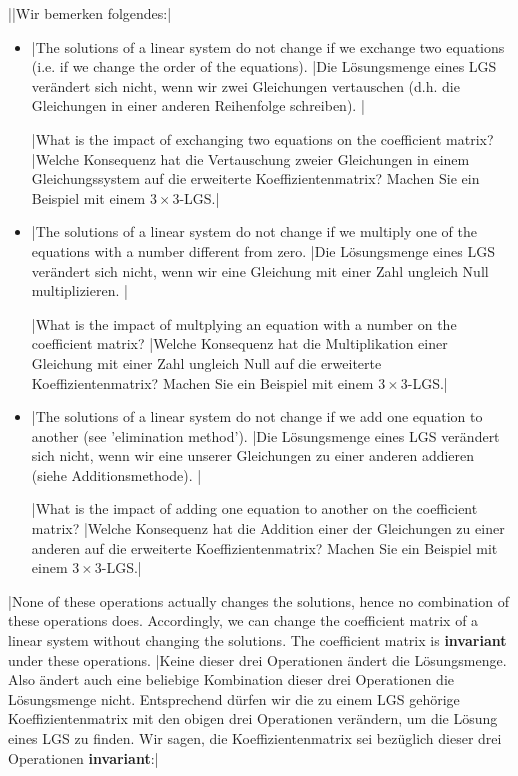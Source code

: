 \tr||Wir bemerken folgendes:|
\begin{itemize}
\item \tr|The solutions of a linear system do not change if we exchange two equations (i.e. if we change the order of the equations).
         |Die Lösungsmenge eines LGS verändert sich nicht, wenn wir zwei Gleichungen vertauschen (d.h. die Gleichungen in einer anderen Reihenfolge schreiben). |
\begin{exer}
\tr|What is the impact of exchanging two equations on the coefficient matrix?
   |Welche Konsequenz hat die Vertauschung zweier Gleichungen in einem Gleichungssystem auf die erweiterte Koeffizientenmatrix? Machen Sie ein Beispiel mit einem $3\times 3$-LGS.|
\end{exer}
\vfill

\item \tr|The solutions of a linear system do not change if we multiply one of the equations with a number different from zero.
         |Die Lösungsmenge eines LGS verändert sich nicht, wenn wir eine Gleichung mit einer Zahl ungleich Null multiplizieren. |
\begin{exer}
\tr|What is the impact of multplying an equation with a number on the coefficient matrix?
   |Welche Konsequenz hat die Multiplikation einer Gleichung mit einer Zahl ungleich Null auf die erweiterte Koeffizientenmatrix? Machen Sie ein Beispiel mit einem $3\times 3$-LGS.|
\end{exer}
\vfill

\item \tr|The solutions of a linear system do not change if we add one equation to another (see 'elimination method').
         |Die Lösungsmenge eines LGS verändert sich nicht, wenn wir eine unserer Gleichungen zu einer anderen addieren (siehe Additionsmethode). |
\begin{exer}
\tr|What is the impact of adding one equation to another on the coefficient matrix?
   |Welche Konsequenz hat die Addition einer der Gleichungen zu einer anderen auf die erweiterte Koeffizientenmatrix? Machen Sie ein Beispiel mit einem $3\times 3$-LGS.|
\end{exer}
\end{itemize}
\vfill

\newpage
\tr|None of these operations actually changes the solutions, hence no combination of these operations does.
    Accordingly, we can change the coefficient matrix of a linear system without changing the solutions.
    The coefficient matrix is \textbf{invariant} under these operations.
   |Keine dieser drei Operationen ändert die Lösungsmenge. Also ändert auch eine beliebige Kombination dieser drei Operationen die Lösungsmenge nicht.
    Entsprechend dürfen wir die zu einem LGS gehörige Koeffizientenmatrix mit den obigen drei Operationen verändern, um die Lösung eines LGS zu finden.
    Wir sagen, die Koeffizientenmatrix sei bezüglich dieser drei Operationen \textbf{invariant}:|


